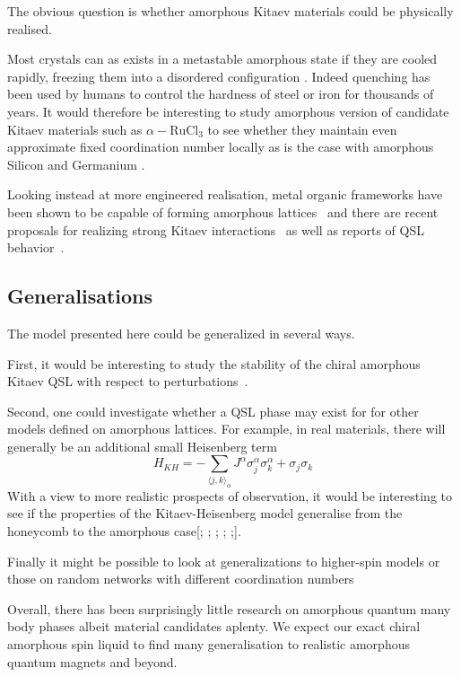The obvious question is whether amorphous Kitaev materials could be physically realised.

Most crystals can as exists in a metastable amorphous state if they are cooled rapidly, freezing them into a disordered configuration \autocite{Weaire1976,Petrakovski1981,Kaneyoshi2018}. Indeed quenching has been used by humans to control the hardness of steel or iron for thousands of years. It would therefore be interesting to study amorphous version of candidate Kitaev materials \autocite{trebstKitaevMaterials2022} such as \(\alpha-\textrm{RuCl}_3\) to see whether they maintain even approximate fixed coordination number locally as is the case with amorphous Silicon and Germanium \autocite{Weaire1971,betteridge1973possible}.

Looking instead at more engineered realisation, metal organic frameworks have been shown to be capable of forming amorphous lattices~\autocite{bennett2014amorphous} and there are recent proposals for realizing strong Kitaev interactions~\autocite{yamadaDesigningKitaevSpin2017} as well as reports of QSL behavior~\autocite{misumiQuantumSpinLiquid2020}.

\hypertarget{generalisations}{%
\subsection{Generalisations}\label{generalisations}}

The model presented here could be generalized in several ways.

First, it would be interesting to study the stability of the chiral amorphous Kitaev QSL with respect to perturbations~\autocite{Rau2014,Chaloupka2010,Chaloupka2013,Chaloupka2015,Winter2016}.

Second, one could investigate whether a QSL phase may exist for for other models defined on amorphous lattices. For example, in real materials, there will generally be an additional small Heisenberg term \[H_{KH} =  - \sum_{\langle j,k\rangle_\alpha} J^{\alpha}\sigma_j^{\alpha}\sigma_k^{\alpha} + \sigma_j\sigma_k\] With a view to more realistic prospects of observation, it would be interesting to see if the properties of the Kitaev-Heisenberg model generalise from the honeycomb to the amorphous case{[}\textcite{Chaloupka2010}; \textcite{Chaloupka2015}; \textcite{Jackeli2009}; \textcite{Kalmeyer1989}; \textcite{manousakisSpinTextonehalfHeisenberg1991};{]}.

Finally it might be possible to look at generalizations to higher-spin models or those on random networks with different coordination numbers \autocite{Baskaran2008,Yao2009,Nussinov2009,Yao2011,Chua2011,Natori2020,Chulliparambil2020,Chulliparambil2021,Seifert2020,WangHaoranPRB2021,Wu2009}

Overall, there has been surprisingly little research on amorphous quantum many body phases albeit material candidates aplenty. We expect our exact chiral amorphous spin liquid to find many generalisation to realistic amorphous quantum magnets and beyond.
